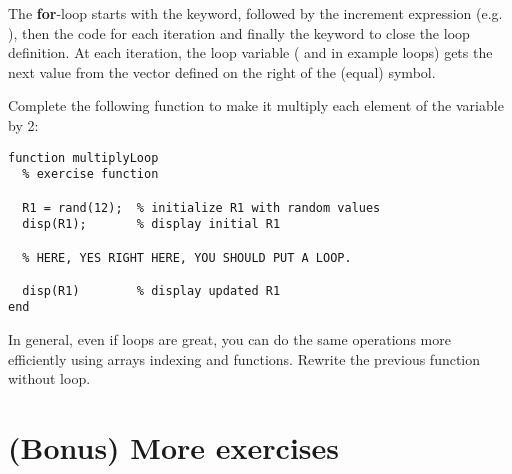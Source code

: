 \documentclass{article}
\begin{document}
The \textbf{for}-loop starts with the  keyword, followed by the increment expression (e.g. ), then the code for each iteration and finally the  keyword to close the loop definition.
At each iteration, the loop variable ( and  in example loops) gets the next value from the vector defined on the right of the \mcode{=} (equal) symbol.

Complete the following function to make it multiply each element of the variable  by 2:
\begin{lstlisting}
function multiplyLoop
  % exercise function

  R1 = rand(12);  % initialize R1 with random values
  disp(R1);       % display initial R1

  % HERE, YES RIGHT HERE, YOU SHOULD PUT A LOOP.

  disp(R1)        % display updated R1
end
\end{lstlisting}

In general, even if loops are great, you can do the same operations more efficiently using arrays indexing and functions.
Rewrite the previous function  without loop.


\section{(Bonus) More exercises}
\end{document}
